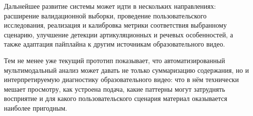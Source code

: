 Дальнейшее развитие системы может идти в нескольких направлениях:
расширение валидационной выборки, проведение пользовательского исследования,
реализация и калибровка метрики соответствия выбранному сценарию, улучшение
детекции артикуляционных и речевых особенностей, а также адаптация пайплайна
к другим источникам образовательного видео.

Тем не менее уже текущий прототип
показывает, что автоматизированный мультимодальный анализ может давать не
только суммаризацию содержания, но и интерпретируемую диагностику
образовательного видео: что в нём технически мешает просмотру, как устроена
подача, какие паттерны могут затруднять восприятие и для какого
пользовательского сценария материал оказывается наиболее пригодным.